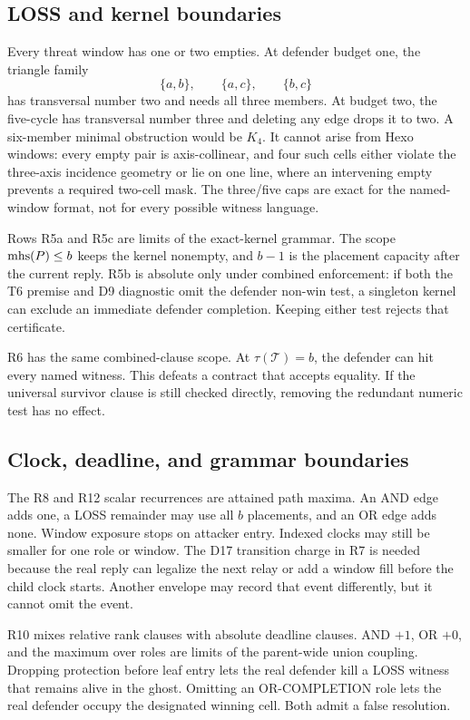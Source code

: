 \subsection{LOSS and kernel boundaries}

Every threat window has one or two empties.  At defender budget one, the
triangle family
\[
  \{a,b\},\qquad \{a,c\},\qquad \{b,c\}
\]
has transversal number two and needs all three members.  At budget two, the
five-cycle has transversal number three and deleting any edge drops it to
two.  A six-member minimal obstruction would be $K_4$.  It cannot arise from
Hexo windows: every empty pair is axis-collinear, and four such cells either
violate the three-axis incidence geometry or lie on one line, where an
intervening empty prevents a required two-cell mask.  The three/five caps are
exact for the named-window format, not for every possible witness language.

Rows R5a and R5c are limits of the exact-kernel grammar.  The scope
$\operatorname{mhs}(P)\le b$ keeps the kernel nonempty, and $b-1$ is the placement capacity
after the current reply.  R5b is absolute only under combined enforcement:
if both the T6 premise and D9 diagnostic omit the defender non-win test, a
singleton kernel can exclude an immediate defender completion.  Keeping
either test rejects that certificate.

R6 has the same combined-clause scope.  At
$\tau(\mathcal T)=b$, the defender can hit every named witness.  This defeats
a contract that accepts equality.  If the universal survivor clause is still
checked directly, removing the redundant numeric test has no effect.

\subsection{Clock, deadline, and grammar boundaries}

The R8 and R12 scalar recurrences are attained path maxima.  An AND edge adds
one, a LOSS remainder may use all $b$ placements, and an OR edge adds none.
Window exposure stops on attacker entry.  Indexed clocks may still be smaller
for one role or window.  The D17 transition charge in R7 is needed because the
real reply can legalize the next relay or add a window fill before the child
clock starts.  Another envelope may record that event differently, but it
cannot omit the event.

R10 mixes relative rank clauses with absolute deadline clauses.  AND $+1$,
OR $+0$, and the maximum over roles are limits of the parent-wide union
coupling.  Dropping protection before leaf entry lets the real defender kill
a LOSS witness that remains alive in the ghost.  Omitting an OR-COMPLETION
role lets the real defender occupy the designated winning cell.  Both admit a
false resolution.

